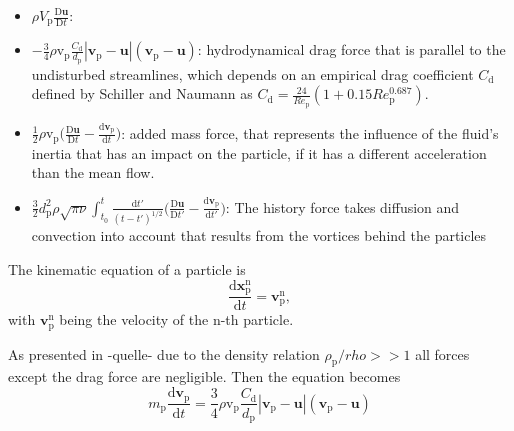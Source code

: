 \documentclass[11pt,a4paper,openany,oneside,parskip=half*]{article}
\renewcommand*\vec[1]{\boldsymbol{#1}}
\begin{document}
\begin{itemize} 
\item  $\rho V_\mathrm{p}\frac{\mathrm{D}\vec{u}}{\mathrm{D}t}$: \newline

\item  $-\frac{3}{4}\rho \mathrm{v}_\mathrm{p} \frac{C_\mathrm{d}}{d_\mathrm{p}}|\vec{v}_\mathrm{p}-    \vec{u}|(\vec{v}_\mathrm{p}-\vec{u})$:\newline
hydrodynamical drag force that is parallel to the undisturbed streamlines, which depends on an empirical drag coefficient $C_{\mathrm{d}}$ defined by Schiller and Naumann as
$C_\mathrm{d} = \frac{24}{Re_\mathrm{p}}(1+0.15Re_\mathrm{p}^\mathrm{0.687})$.

\item $\frac{1}{2}\rho \mathrm{v}_\mathrm{p} \biggl(\frac{\mathrm{D}\vec{u}}{\mathrm{D}t}-\frac{\mathrm{d}\vec{v}_\mathrm{p}}{\mathrm{d}t}\biggl)$:\newline
added mass force, that represents the influence of the fluid's inertia that has an impact on the particle, if it has a different acceleration than the mean flow.
\item $\frac{3}{2}d_\mathrm{p}^\mathrm{2}\rho\sqrt{\pi\nu}\int_{t_\mathrm{0}}^{t} \frac{\mathrm{d}t'}{(t-t')^\mathrm{1/2}} \biggl(\frac{\mathrm{D}\vec{u}}{\mathrm{D}t'}- \frac{\mathrm{d}\vec{v}_\mathrm{p}}{\mathrm{d}t'}\biggl) $: \newline
The history force takes diffusion and convection into account that results from the vortices behind the particles 
\end{itemize}
 

The kinematic equation of a particle is  
\begin{equation}
 \frac{\mathrm{d}\vec{x}_\mathrm{p}^\mathrm{n}}{\mathrm{d}t} = \vec{v}_\mathrm{p}^\mathrm{n},
\end{equation}
with $\vec{v}_{\mathrm{p}}^\mathrm{n}$ being the velocity of the n-th particle.

As presented in -quelle- due to the density relation $\rho_\mathrm{p}/rho >> 1$ all forces except the drag force are negligible.
Then the equation becomes
\begin{equation}
m_\mathrm{p} \frac{\mathrm{d}\vec{v}_\mathrm{p}}{\mathrm{d}t} = \frac{3}{4}\rho \mathrm{v}_\mathrm{p} \frac{C_\mathrm{d}}{d_\mathrm{p}}|\vec{v}_\mathrm{p}-\vec{u}|(\vec{v}_\mathrm{p}-\vec{u})
\end{equation}


\end{document}

